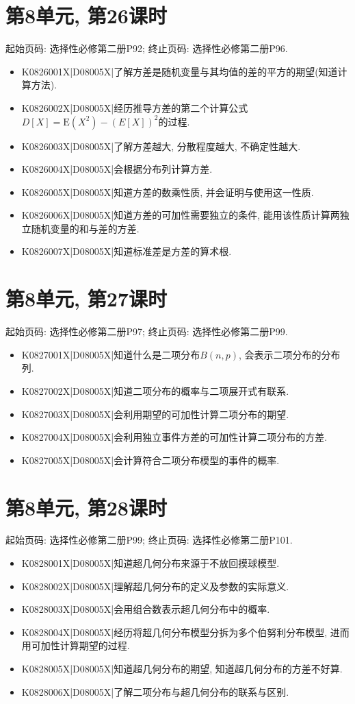 \section*{第8单元, 第26课时}
起始页码: 选择性必修第二册P92; 终止页码: 选择性必修第二册P96.
\begin{itemize}
\item K0826001X|D08005X|了解方差是随机变量与其均值的差的平方的期望(知道计算方法).
\item K0826002X|D08005X|经历推导方差的第二个计算公式$D[X]=\mathrm{E}(X^2)-(E[X])^2$的过程.
\item K0826003X|D08005X|了解方差越大, 分散程度越大, 不确定性越大.
\item K0826004X|D08005X|会根据分布列计算方差.
\item K0826005X|D08005X|知道方差的数乘性质, 并会证明与使用这一性质.
\item K0826006X|D08005X|知道方差的可加性需要独立的条件, 能用该性质计算两独立随机变量的和与差的方差.
\item K0826007X|D08005X|知道标准差是方差的算术根.
\end{itemize}

\section*{第8单元, 第27课时}
起始页码: 选择性必修第二册P97; 终止页码: 选择性必修第二册P99.
\begin{itemize}
\item K0827001X|D08005X|知道什么是二项分布$B(n,p)$, 会表示二项分布的分布列.
\item K0827002X|D08005X|知道二项分布的概率与二项展开式有联系.
\item K0827003X|D08005X|会利用期望的可加性计算二项分布的期望.
\item K0827004X|D08005X|会利用独立事件方差的可加性计算二项分布的方差.
\item K0827005X|D08005X|会计算符合二项分布模型的事件的概率.
\end{itemize}

\section*{第8单元, 第28课时}
起始页码: 选择性必修第二册P99; 终止页码: 选择性必修第二册P101.
\begin{itemize}
\item K0828001X|D08005X|知道超几何分布来源于不放回摸球模型.
\item K0828002X|D08005X|理解超几何分布的定义及参数的实际意义.
\item K0828003X|D08005X|会用组合数表示超几何分布中的概率.
\item K0828004X|D08005X|经历将超几何分布模型分拆为多个伯努利分布模型, 进而用可加性计算期望的过程.
\item K0828005X|D08005X|知道超几何分布的期望, 知道超几何分布的方差不好算.
\item K0828006X|D08005X|了解二项分布与超几何分布的联系与区别.
\end{itemize}

